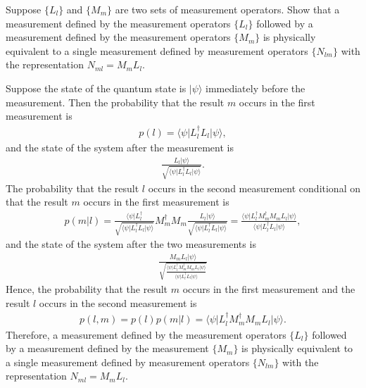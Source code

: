 \documentclass[en]{sol-man}
\begin{document}
\begin{exe}
    Suppose $\{L_l\}$ and $\{M_m\}$ are two sets of measurement operators. Show that a measurement defined by the measurement operators $\{L_l\}$ followed by a measurement defined by the measurement operators $\{M_m\}$ is physically equivalent to a single measurement defined by measurement operators $\{N_{lm}\}$ with the representation $N_{ml}=M_mL_l$.
\end{exe}
\begin{pf}
    Suppose the state of the quantum state is $\lvert\psi\rangle$ immediately before the measurement. Then the probability that the result $m$ occurs in the first measurement is
    \begin{align}
        p(l)=\langle\psi\rvert L_l^{\dagger}L_l\lvert\psi\rangle,
    \end{align}
    and the state of the system after the measurement is
    \begin{align}
        \frac{L_l\lvert\psi\rangle}{\sqrt{\langle\psi\rvert L_l^{\dagger}L_l\lvert\psi\rangle}}.
    \end{align}
    The probability that the result $l$ occurs in the second measurement conditional on that the result $m$ occurs in the first measurement is
    \begin{align}
        p(m\vert l)=\frac{\langle\psi\rvert L_l^{\dagger}}{\sqrt{\langle\psi\rvert L_l^{\dagger}L_l\lvert\psi\rangle}}M_m^{\dagger}M_m\frac{L_l\lvert\psi\rangle}{\sqrt{\langle\psi\rvert L_l^{\dagger}L_l\lvert\psi\rangle}}=\frac{\langle\psi\rvert L_l^{\dagger}M_m^{\dagger}M_mL_l\lvert\psi\rangle}{\langle\psi\rvert L_l^{\dagger}L_l\lvert\psi\rangle},
    \end{align}
    and the state of the system after the two measurements is
    \begin{align}
        \frac{M_mL_l\lvert\psi\rangle}{\sqrt{\frac{\langle\psi\rvert L_l^{\dagger}M_m^{\dagger}M_mL_l\lvert\psi\rangle}{\langle\psi\rvert L_l^{\dagger}L_l\lvert\psi\rangle}}}
    \end{align}
    Hence, the probability that the result $m$ occurs in the first measurement and the result $l$ occurs in the second measurement is
    \begin{align}
        p(l,m)=p(l)p(m\vert l)=\langle\psi\rvert L_l^{\dagger}M_m^{\dagger}M_mL_l\lvert\psi\rangle.
    \end{align}
    Therefore, a measurement defined by the measurement operators $\{L_l\}$ followed by a measurement defined by the measurement $\{M_m\}$ is physically equivalent to a single measurement defined by measurement operators $\{N_{lm}\}$ with the representation $N_{ml}=M_mL_l$.
\end{pf}
\end{document}
